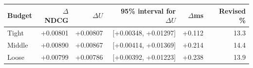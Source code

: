\begin{tabular}{lrrrrr}
\toprule
Budget & $\Delta$NDCG & $\Delta U$ & 95\% interval for $\Delta U$ & $\Delta$ms & Revised \% \\
\midrule
Tight & +0.00801 & +0.00807 & [+0.00348, +0.01297] & +0.112 & 13.3 \\
Middle & +0.00890 & +0.00867 & [+0.00414, +0.01369] & +0.214 & 14.4 \\
Loose & +0.00799 & +0.00786 & [+0.00392, +0.01223] & +0.238 & 13.9 \\
\bottomrule
\end{tabular}
